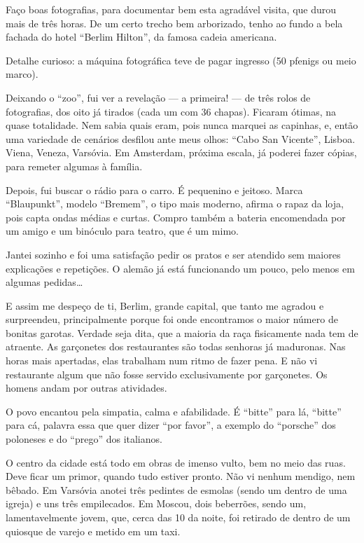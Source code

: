 Faço boas fotografias, para documentar bem esta agradável visita, que durou mais de três horas. De um certo trecho bem arborizado, tenho ao fundo a bela fachada do hotel ``Berlim Hilton'', da famosa cadeia americana.

Detalhe curioso: a máquina fotográfica teve de pagar ingresso (50 pfenigs ou meio marco).

Deixando o ``zoo'', fui ver a revelação --- a primeira! --- de três rolos de fotografias, dos oito já tirados (cada um com 36 chapas). Ficaram ótimas, na quase totalidade. Nem sabia quais eram, pois nunca marquei as capinhas, e, então uma variedade de cenários desfilou ante meus olhos: ``Cabo San Vicente'', Lisboa. Viena, Veneza, Varsóvia. Em Amsterdam, próxima escala, já poderei fazer cópias, para remeter algumas à família.

Depois, fui buscar o rádio para o carro. É pequenino e jeitoso. Marca ``Blaupunkt'', modelo ``Bremem'', o tipo mais moderno, afirma o rapaz da loja, pois capta ondas médias e curtas. Compro também a bateria encomendada por um amigo e um binóculo para teatro, que é um mimo.

Jantei sozinho e foi uma satisfação pedir os pratos e ser atendido sem maiores explicações e repetições. O alemão já está funcionando um pouco, pelo menos em algumas pedidas\ldots

E assim me despeço de ti, Berlim, grande capital, que tanto me agradou e surpreendeu, principalmente porque foi onde encontramos o maior número de bonitas garotas. Verdade seja dita, que a maioria da raça fisicamente nada tem de atraente. As garçonetes dos restaurantes são todas senhoras já maduronas. Nas horas mais apertadas, elas trabalham num ritmo de fazer pena. E não vi restaurante algum que não fosse servido exclusivamente por garçonetes. Os homens andam por outras atividades.

O povo encantou pela simpatia, calma e afabilidade. É ``bitte'' para lá, ``bitte'' para cá, palavra essa que quer dizer ``por favor'', a exemplo do ``porsche'' dos poloneses e do ``prego'' dos italianos.

O centro da cidade está todo em obras de imenso vulto, bem no meio das ruas. Deve ficar um primor, quando tudo estiver pronto. Não vi nenhum mendigo, nem bêbado. Em Varsóvia anotei três pedintes de esmolas (sendo um dentro de uma igreja) e uns três empilecados. Em Moscou, dois beberrões, sendo um, lamentavelmente jovem, que, cerca das 10 da noite, foi retirado de dentro de um quiosque de varejo e metido em um taxi.

